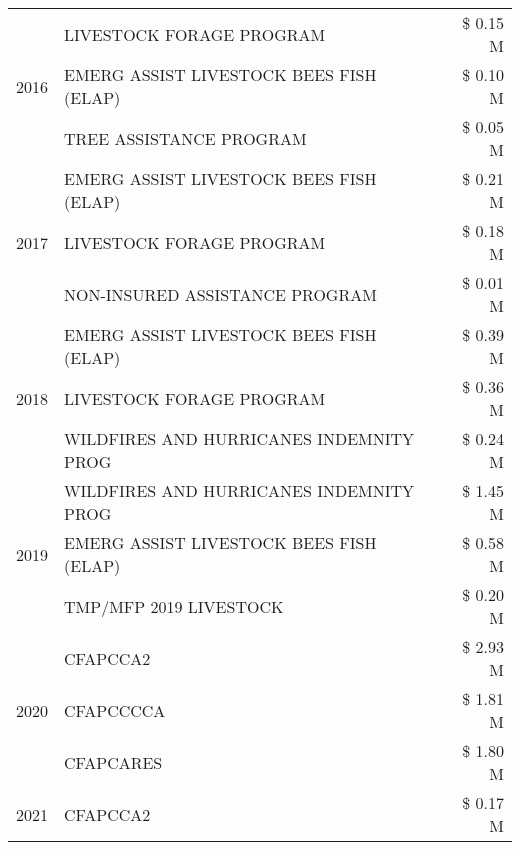 \begin{tabular}{llr}
\cline{1-3}
\multirow[t]{3}{*}{2016} & LIVESTOCK FORAGE PROGRAM                      & \$ 0.15 M \\
 & EMERG ASSIST LIVESTOCK BEES FISH (ELAP)       & \$ 0.10 M \\
 & TREE ASSISTANCE PROGRAM                       & \$ 0.05 M \\
\cline{1-3}
\multirow[t]{3}{*}{2017} & EMERG ASSIST LIVESTOCK BEES FISH (ELAP) & \$ 0.21 M \\
 & LIVESTOCK FORAGE PROGRAM & \$ 0.18 M \\
 & NON-INSURED ASSISTANCE PROGRAM & \$ 0.01 M \\
\cline{1-3}
\multirow[t]{3}{*}{2018} & EMERG ASSIST LIVESTOCK BEES FISH (ELAP) & \$ 0.39 M \\
 & LIVESTOCK FORAGE PROGRAM & \$ 0.36 M \\
 & WILDFIRES AND HURRICANES INDEMNITY PROG & \$ 0.24 M \\
\cline{1-3}
\multirow[t]{3}{*}{2019} & WILDFIRES AND HURRICANES INDEMNITY PROG & \$ 1.45 M \\
 & EMERG ASSIST LIVESTOCK BEES FISH (ELAP) & \$ 0.58 M \\
 & TMP/MFP 2019 LIVESTOCK & \$ 0.20 M \\
\cline{1-3}
\multirow[t]{3}{*}{2020} & CFAPCCA2 & \$ 2.93 M \\
 & CFAPCCCCA & \$ 1.81 M \\
 & CFAPCARES & \$ 1.80 M \\
\cline{1-3}
2021 & CFAPCCA2 & \$ 0.17 M \\
\cline{1-3}
\bottomrule
\end{tabular}
